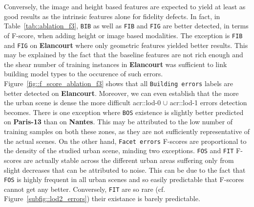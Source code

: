         Conversely, the image and height based features are expected to yield at least as good results as the intrinsic features alone for fidelity defects.
        In fact, in Table~\ref{tab::ablation_f3}, \texttt{BIB} as well as \texttt{FIB} and \texttt{FIG} are better detected, in terms of F-score, when adding height or image based modalities.
        The exception is \texttt{FIB} and \texttt{FIG} on \textbf{Elancourt} where only geometric features yielded better results.
        This may be explained by the fact that the baseline features are not rich enough and the shear number of training instances in \textbf{Elancourt} was sufficient to link building model types to the occurence of such errors.\\

        Figure~\ref{fig::f_score_ablation_f3} shows that all \texttt{Building errors} labels are better detected on \textbf{Elancourt}.
        Moreover, we can even establish that the more the urban scene is dense the more difficult \gls{acr::lod}-0 \(\cup\) \gls{acr::lod}-1 errors detection becomes.
        There is one exception where \texttt{BOS} existence is slightly better predicted on \textbf{Paris-13} than on \textbf{Nantes}.
        This may be attributed to the low number of training samples on both these zones, as they are not sufficiently representative of the actual scenes.
        On the other hand, \texttt{Facet errors} F-scores are proportional to the density of the studied urban scene, minding two exceptions.
        \texttt{FOS} and \texttt{FIT} F-scores are actually stable across the different urban areas suffering only from slight decreases that can be attributed to noise.
        This can be due to the fact that \texttt{FOS} is highly frequent in all urban scenes and so easily predictable that F-scores cannot get any better. 
        Conversely, \texttt{FIT} are so rare (cf. Figure~\ref{subfig::lod2_errors}) their existance is barely predictable.

